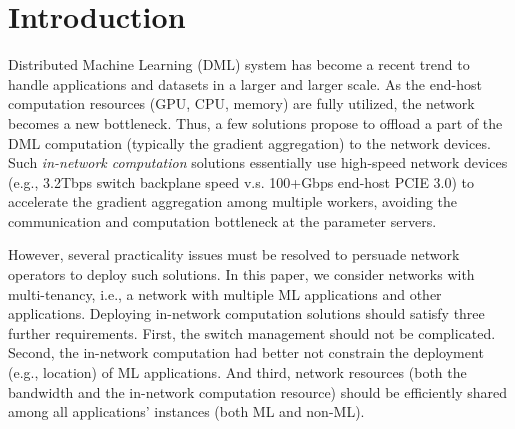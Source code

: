 \section{Introduction}
Distributed Machine Learning (DML) system has become a recent trend to handle applications and datasets in a larger and larger scale. As the end-host computation resources (GPU, CPU, memory) are fully utilized, the network becomes a new bottleneck. Thus, a few solutions propose to offload a part of the DML computation (typically the gradient aggregation) to the network devices. Such \emph{in-network computation} solutions essentially use high-speed network devices (e.g., 3.2Tbps switch backplane speed v.s. 100+Gbps end-host PCIE 3.0) to accelerate the gradient aggregation among multiple workers, avoiding the communication and computation bottleneck at the parameter servers.



However, several practicality issues must be resolved to persuade network operators to deploy such solutions. In this paper, we consider networks with multi-tenancy, i.e., a network with multiple ML applications and other applications. Deploying in-network computation solutions should satisfy three further requirements. First, the switch management should not be complicated. Second, the in-network computation had better not constrain the deployment (e.g., location) of ML applications. And third, network resources (both the bandwidth and the in-network computation resource) should be efficiently shared among all applications' instances (both ML and non-ML).


